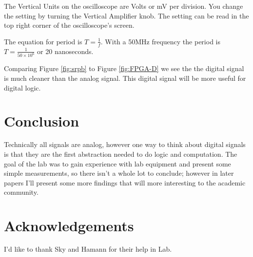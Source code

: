 \documentclass[journal,onecolumn]{IEEEtran}
\begin{document}
The Vertical Units on the oscilloscope are Volts or mV per division. You change the setting by turning the Vertical Amplifier knob. The setting can be read in the top right corner of the oscilloscope's screen.

The equation for period is $T = \frac{1}{f}$. With a 50MHz frequency the period is $T = \frac{1}{50\times 10^6}$ or 20 nanoseconds.

Comparing Figure \ref{fig:srpb} to Figure \ref{fig:FPGA-D} we see the the digital signal is much cleaner than the analog signal. This digital signal will be more useful for digital logic.
\section*{Conclusion}
Technically all signals are analog, however one way to think about digital signals is that they are the first abstraction needed to do logic and computation. The goal of the lab was to gain experience with lab equipment and present some simple measurements, so there isn't a whole lot to conclude; however in later papers I'll present some more findings that will more interesting to the academic community.
\section*{Acknowledgements}
I'd like to thank Sky and Hamann for their help in Lab.


\end{document}
